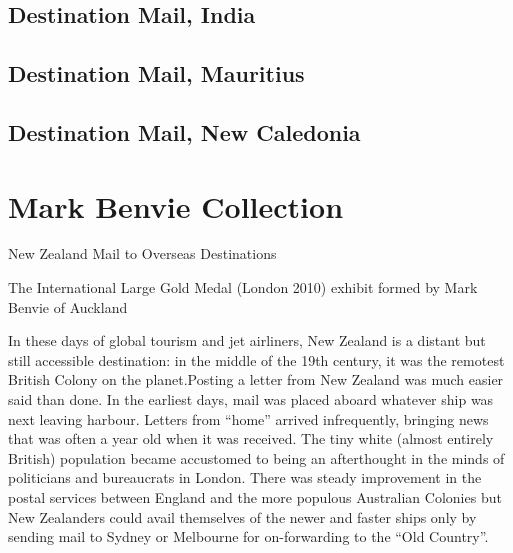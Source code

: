 \documentclass[justified]{tufte-book}
\begin{document}
\section{Destination Mail, India}




\newpage
\section{Destination Mail, Mauritius}


\section{Destination Mail, New Caledonia}






\appendix

\chapter{Mark Benvie Collection}
\normalsize

New Zealand Mail to Overseas Destinations

The International Large Gold Medal (London 2010)
exhibit formed by Mark Benvie of Auckland

In these days of global tourism and jet airliners, New Zealand is a distant but still accessible destination: in the middle of the 19th century, it was the remotest British Colony on the planet.Posting a letter from New Zealand was much easier said than done.  In the earliest days, mail was placed aboard whatever ship was next leaving harbour.  Letters from “home” arrived infrequently, bringing news that was often a year old when it was received.
The tiny white (almost entirely British) population became accustomed to being an afterthought in the minds of politicians and bureaucrats in London.  There was steady improvement in the postal services between England and the more populous Australian Colonies but New Zealanders could avail themselves of the newer and faster ships only by sending mail to Sydney or Melbourne for on-forwarding to the “Old Country”.
\end{document}
